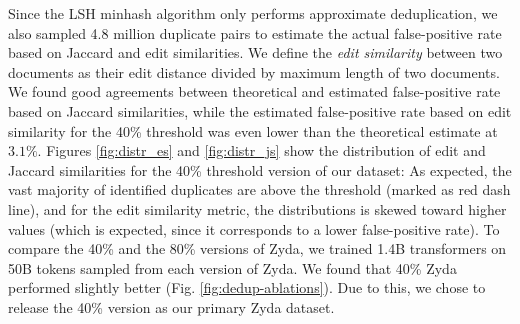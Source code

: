 \documentclass{article}
\begin{document}
Since the LSH minhash algorithm only performs approximate deduplication, we also sampled 4.8 million duplicate pairs to estimate the actual false-positive rate based on Jaccard and edit similarities. We define the {\it edit similarity} between two documents as their edit distance divided by maximum length of two documents. We found good agreements between theoretical and estimated false-positive rate based on Jaccard similarities, while the estimated false-positive rate based on edit similarity for the 40\% threshold was even lower than the theoretical estimate at $3.1\%$. Figures \ref{fig:distr_es} and \ref{fig:distr_js} show the distribution of edit and Jaccard similarities for the 40\% threshold version of our dataset: As expected, the vast majority of identified duplicates are above the threshold (marked as red dash line), and for the edit similarity metric, the distributions is skewed toward higher values (which is expected, since it corresponds to a lower false-positive rate). To compare the 40\% and the 80\% versions of Zyda, we trained 1.4B transformers on 50B tokens sampled from each version of Zyda. We found that 40\% Zyda performed slightly better (Fig. \ref{fig:dedup-ablations}). Due to this, we chose to release the 40\% version as our primary Zyda dataset.

\end{document}
